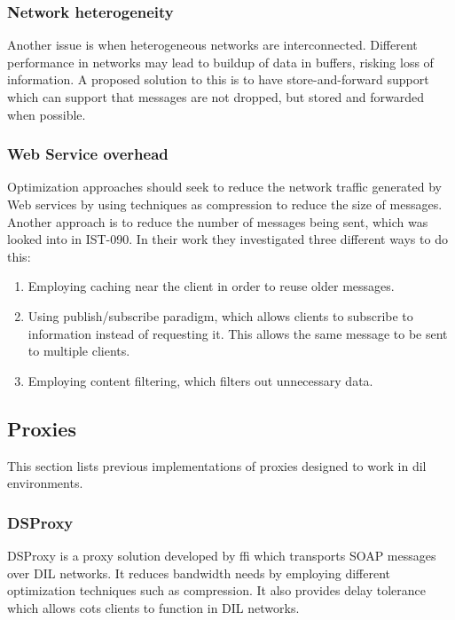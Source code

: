 \subsubsection{Network heterogeneity}

Another issue is when heterogeneous networks are interconnected. Different
performance in networks may lead to buildup of data in buffers, risking loss of
information. A proposed solution to this is to have store-and-forward support
which can support that messages are not dropped, but stored and forwarded when
possible.


\subsubsection{Web Service overhead}

Optimization approaches should seek to reduce the network traffic generated by
Web services by using techniques as compression to reduce the size of messages.
Another approach is to reduce the number of messages being sent, which was
looked into in IST-090\cite{ist-090}. In their work they investigated three
different ways to do this:

\begin{enumerate}
    \item Employing caching near the client in order to reuse older messages.
    \item Using publish/subscribe paradigm, which allows clients to subscribe to
    information instead of requesting it. This allows the same message to be sent
    to multiple clients.
    \item Employing content filtering, which filters out unnecessary data.
\end{enumerate}


\subsection{Proxies}

This section lists previous implementations of proxies designed to work in
\gls{dil} environments.


\subsubsection{DSProxy}

DSProxy is a proxy solution developed by \gls{ffi} which transports SOAP
messages over DIL networks. It reduces bandwidth needs by employing different
optimization techniques such as compression. It also provides delay tolerance
which allows \gls{cots} clients to function in DIL networks.


